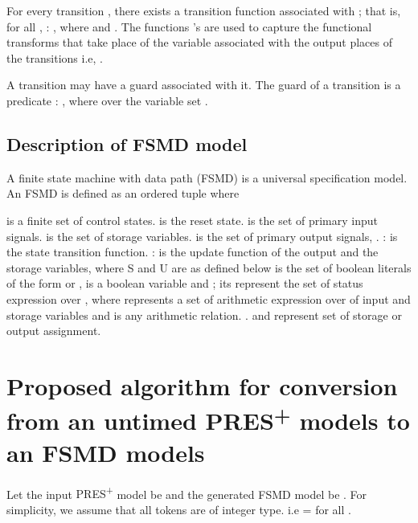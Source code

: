 \documentclass[9pt,executive]{article}
\def\presp{PRES\textsuperscript{+}}
\def\fsmd{FSMD}
\def\fsmdb{(FSMD)}
\def\presp{PRES\textsuperscript{+}}
\def\fsmd{FSMD}
\def\fsmdb{(FSMD)}
\begin{document}
  For every transition , there exists a transition  function  associated
with ; that is, for all , : , where  and
. The functions 's are used to capture the functional transforms that take place of the variable associated with the output places of the transitions i.e, .

  A transition  may have a guard  associated with it. The guard of a
transition  is a predicate : , where  over the
variable set . 
\subsection { Description of {\fsmd} model}
 A finite state machine with data path {\fsmdb} is a universal specification model. An
{\fsmd} is defined as an ordered tuple  where 

  is a finite set of control states.
  is the reset state.
  is the set of primary input signals.
  is the set of storage variables.
  is the set of primary output signals, .
 :  is the state transition function.
 :  is the update function of the output and the storage variables, where S and U are as defined below
  is the set of boolean literals of the form  or ,  is a boolean variable and ; its represent the set of status expression over , where  represents a set of arithmetic expression over  of input and storage variables and  is any arithmetic relation. .
   and  represent set of storage or output assignment. 
  

\section{Proposed algorithm for conversion from an untimed {\presp} models to an {\fsmd} models}\label{algorithm}
 Let the input {\presp} model be  and the generated {\fsmd} model be . For simplicity, we assume that all tokens are of integer type. i.e  =  for all .
\end{document}

